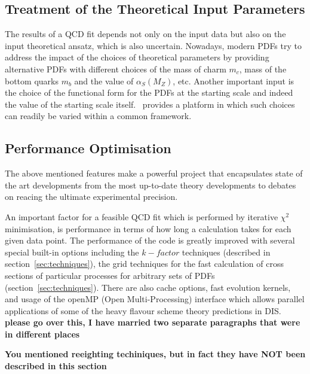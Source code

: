 \subsection{Treatment of the Theoretical Input Parameters}

The results of a QCD fit depends not only on the input data but also on the 
input theoretical ansatz, which is also uncertain. Nowadays, modern PDFs 
try to address the impact of the choices of theoretical parameters by providing
alternative PDFs with different choices of the mass of charm $m_c$, mass of the bottom quarks $m_b$ and the value of $\alpha_S(M_Z)$, etc. 
Another important input is the choice of the functional form for the PDFs at the starting scale and indeed the value of the starting scale itself. \fitter\ provides a platform in which such choices can readily be varied within a common framework.


\subsection{Performance Optimisation}

The above mentioned features make \fitter a powerful project that encapsulates 
state of the art developments from the most up-to-date theory developments to
debates on reacing the ultimate experimental precision. 

An important factor for a feasible QCD fit which is performed by iterative 
$\chi^2$ minimisation, is performance in terms of how long a calculation takes for each given data point.
The performance of the \fitter  code is greatly improved with several special built-in options
including the $k-factor$ techniques (described in section~\ref{sec:techniques}), the grid techniques for the fast calculation of cross 
sections of particular processes for arbitrary sets of PDFs (section~\ref{sec:techniques}). There are also cache options, fast evolution kernels, and 
usage of the openMP (Open Multi-Processing) interface which allows
parallel applications of some of the heavy flavour scheme theory predictions in DIS. {\bf please go over this, I have married two separate paragraphs that were in different places}

{\bf You mentioned reeighting techiniques, but in fact they have NOT been described in this section}





